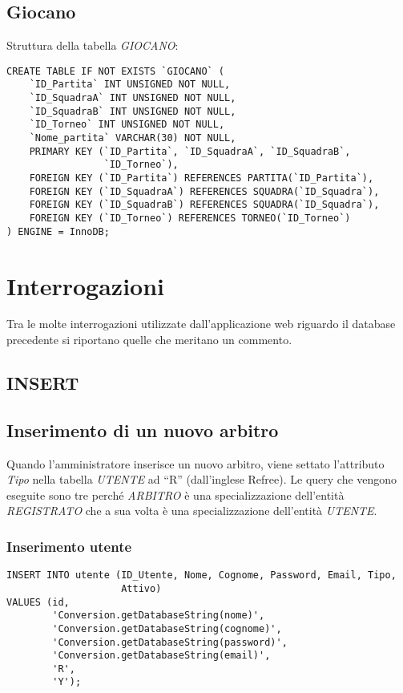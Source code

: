 \newpage

\subsection{Giocano}
Struttura della tabella \emph{GIOCANO}:

\begin{lstlisting}
CREATE TABLE IF NOT EXISTS `GIOCANO` (
	`ID_Partita` INT UNSIGNED NOT NULL,
	`ID_SquadraA` INT UNSIGNED NOT NULL,
	`ID_SquadraB` INT UNSIGNED NOT NULL,
	`ID_Torneo` INT UNSIGNED NOT NULL,
	`Nome_partita` VARCHAR(30) NOT NULL,
	PRIMARY KEY (`ID_Partita`, `ID_SquadraA`, `ID_SquadraB`,
	             `ID_Torneo`),
	FOREIGN KEY (`ID_Partita`) REFERENCES PARTITA(`ID_Partita`),
	FOREIGN KEY (`ID_SquadraA`) REFERENCES SQUADRA(`ID_Squadra`),
	FOREIGN KEY (`ID_SquadraB`) REFERENCES SQUADRA(`ID_Squadra`),
	FOREIGN KEY (`ID_Torneo`) REFERENCES TORNEO(`ID_Torneo`)
) ENGINE = InnoDB;
\end{lstlisting}

\section{Interrogazioni}
Tra le molte interrogazioni utilizzate dall'applicazione web riguardo il database precedente si riportano quelle che meritano un commento.

\subsection{INSERT}

\subsection*{Inserimento di un nuovo arbitro}
Quando l'amministratore inserisce un nuovo arbitro, viene settato l'attributo \emph{Tipo} nella tabella \emph{UTENTE} ad ``R'' (dall'inglese Refree). Le query che vengono eseguite sono tre perché \emph{ARBITRO} è una specializzazione dell'entità \emph{REGISTRATO} che a sua volta è una specializzazione dell'entità \emph{UTENTE}.

\subsubsection*{Inserimento utente}

\begin{lstlisting}
INSERT INTO utente (ID_Utente, Nome, Cognome, Password, Email, Tipo,
                    Attivo)
VALUES (id,
        'Conversion.getDatabaseString(nome)',
        'Conversion.getDatabaseString(cognome)',
        'Conversion.getDatabaseString(password)',
        'Conversion.getDatabaseString(email)',
        'R',
        'Y');
\end{lstlisting}

